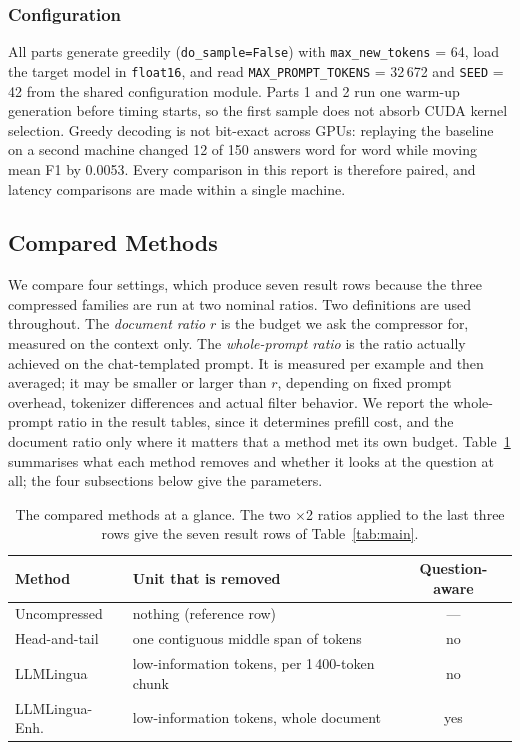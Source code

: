 ﻿\documentclass[10pt,a4paper,twocolumn]{article}
\begin{document}
\subsubsection{Configuration}
\label{sec:config}

All parts generate greedily (\texttt{do\_sample=False}) with
\texttt{max\_new\_tokens} = 64, load the target model in \texttt{float16}, and
read \texttt{MAX\_PROMPT\_TOKENS} = 32\,672 and \texttt{SEED} = 42 from the
shared configuration module. Parts 1 and 2 run one warm-up generation before timing
starts, so the first sample does not absorb CUDA kernel selection. Greedy
decoding is not bit-exact across GPUs: replaying the baseline on a second machine
changed 12 of 150 answers word for word while moving mean F1 by 0.0053. Every
comparison in this report is therefore paired, and latency comparisons are made
within a single machine.

\subsection{Compared Methods}
\label{sec:methods}

We compare four settings, which produce seven result rows because the three
compressed families are run at two nominal ratios. Two definitions are used
throughout. The \emph{document ratio} $r$ is the budget we ask the compressor for,
measured on the context only. The \emph{whole-prompt ratio} is the ratio actually
achieved on the chat-templated prompt. It is measured per example and then averaged; it may be smaller or larger than $r$, depending on fixed prompt overhead, tokenizer differences and actual filter behavior. We report the whole-prompt
ratio in the result tables, since it determines prefill cost, and the document
ratio only where it matters that a method met its own budget.
Table~\ref{tab:methods} summarises what each method removes and whether it looks
at the question at all; the four subsections below give the parameters.

\begin{table}[t]
\centering
\footnotesize
\begin{tabularx}{\columnwidth}{@{}lXc@{}}
\toprule
Method & Unit that is removed & Question-aware \\
\midrule
Uncompressed  & nothing (reference row)               & --- \\
Head-and-tail & one contiguous middle span of tokens & no \\
LLMLingua     & low-information tokens, per 1\,400-token chunk & no \\
LLMLingua-Enh.& low-information tokens, whole document & yes \\
\bottomrule
\end{tabularx}
\caption{The compared methods at a glance. The two $\times$2 ratios applied to the
last three rows give the seven result rows of Table~\ref{tab:main}.}
\label{tab:methods}
\end{table}
\end{document}
